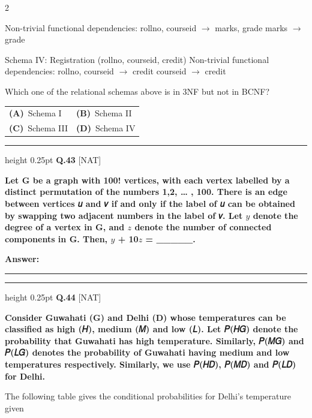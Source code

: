 \documentclass[a4paper,10pt,twoside]{article}
\begin{document}
\begin{multicols}{2}
{Non-trivial functional dependencies:
rollno, courseid $\to$ marks, grade
marks $\to$ grade
\par\smallskip
Schema IV: Registration (rollno, courseid, credit)
Non-trivial functional dependencies:
rollno, courseid $\to$ credit
courseid $\to$ credit
\par\smallskip
Which one of the relational schemas above is in 3NF but not in BCNF? \par}
\par\vspace{2pt}\noindent
\begin{tabular*}{\columnwidth}{@{\extracolsep{\fill}}p{}p{}@{}}
\textbf{(A)}~Schema I & \textbf{(B)}~Schema II \\
\addlinespace[2pt]
\textbf{(C)}~Schema III & \textbf{(D)}~Schema IV
\end{tabular*}
\par\vspace{6pt}\hrule height 0.25pt\vspace{6pt}
\noindent\textbf{Q.43} \hfill {\footnotesize\textsf{[NAT]}}
\par\vspace{2pt}
{\bfseries Let G be a graph with 100! vertices, with each vertex labelled by a distinct permutation of
the numbers 1,2, … , 100. There is an edge between vertices 𝑢 and 𝑣 if and only if the label
of 𝑢 can be obtained by swapping two adjacent numbers in the label of 𝑣. Let $y$ denote the
degree of a vertex in G, and $z$ denote the number of connected components in G.
Then, $y$ + 10$z$ = \_\_\_\_\_. \par}
\par\vspace{3pt}\noindent\textbf{Answer:} \rule{3.2cm}{0.4pt}
\par\vspace{6pt}\hrule height 0.25pt\vspace{6pt}
\noindent\textbf{Q.44} \hfill {\footnotesize\textsf{[NAT]}}
\par\vspace{2pt}
{\bfseries Consider Guwahati (G) and Delhi (D) whose temperatures can be classified as high (𝐻),
medium (𝑀) and low (𝐿). Let 𝑃(𝐻𝐺) denote the probability that Guwahati has high
temperature. Similarly, 𝑃(𝑀𝐺) and 𝑃(𝐿𝐺) denotes the probability of Guwahati having
medium and low temperatures respectively. Similarly, we use 𝑃(𝐻𝐷), 𝑃(𝑀𝐷) and 𝑃(𝐿𝐷) for
Delhi.
\par\smallskip
The following table gives the conditional probabilities for Delhi's temperature given
}
\end{multicols}
\end{document}

